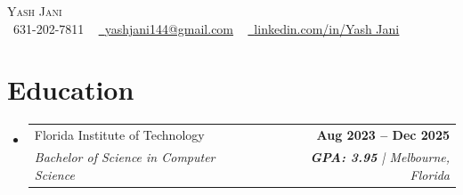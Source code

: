 \documentclass[letterpaper,11pt]{article}
\makeatletter
\newcommand{\resumeSubheading}[4]{
  \vspace{-2pt}\item
    \begin{tabular*}{1.0\textwidth}[t]{l@{\extracolsep{\fill}}r}
      \small#1 & \textbf{\small #2} \\
      \textit{\small#3} & \textit{\small #4} \\
    \end{tabular*}\vspace{-9pt}
}
\newcommand{\resumeSubHeadingListStart}{\begin{itemize}[leftmargin=0.0in, label={}]}
\newcommand{\resumeSubHeadingListEnd}{\end{itemize}}
\makeatother
\begin{document}

\begin{center}
    {\Huge \scshape Yash Jani} \\ \vspace{1pt}
    \small \raisebox{-0.1\height}\faPhone\ 631-202-7811 ~ \href{mailto:yashjani144@gmail.com}{\raisebox{-0.2\height}\faEnvelope\  \underline{yashjani144@gmail.com}} ~ 
    \href{https://www.linkedin.com/in/yash-jani-8245bb26a/}{\raisebox{-0.2\height}\faLinkedin\ \underline{linkedin.com/in/Yash Jani}}  ~
    \vspace{-10pt}
\end{center}


\section{Education}
  \resumeSubHeadingListStart
    \resumeSubheading      
      {Florida Institute of Technology}{Aug 2023 -- Dec 2025}
      {Bachelor of Science in Computer Science}{\textbf{GPA: 3.95} | Melbourne, Florida}
  \resumeSubHeadingListEnd
  \vspace{-8pt}
  
\end{document}

